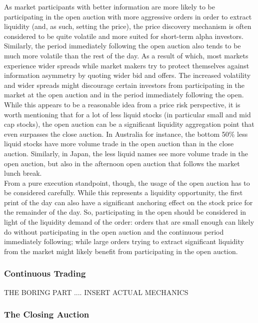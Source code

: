 As market participants with better information are more likely to be participating in the open auction with more aggressive orders in order to extract liquidity (and, as such, setting the price), the price discovery mechanism is often considered to be quite volatile and more suited for short-term alpha investors. Similarly, the period immediately following the open auction also tends to be much more volatile than the rest of the day. As a result of which, most markets experience wider spreads while market makers try to protect themselves against information asymmetry by quoting wider bid and offers. 
The increased volatility and wider spreads might discourage certain investors from participating in the market at the open auction and in the period immediately following the open. While this appears to be a reasonable idea from a price risk perspective, it is worth mentioning that for a lot of less liquid stocks (in particular small and mid cap stocks), the open auction can be a significant liquidity aggregation point that even surpasses the close auction. In Australia for instance, the bottom 50\% less liquid stocks have more volume trade in the open auction than in the close auction. Similarly, in Japan, the less liquid names see more volume trade in the open auction, but also in the afternoon open auction that follows the market lunch break.\\

From a pure execution standpoint, though, the usage of the open auction has to be considered carefully. While this represents a liquidity opportunity, the first print of the day can also have a significant anchoring effect on the stock price for the remainder of the day. So, participating in the open should be considered in light of the liquidity demand of the order: orders that are small enough can likely do without participating in the open auction and the continuous period immediately following; while large orders trying to extract significant liquidity from the market might likely benefit from participating in the open auction.


\subsubsection{Continuous Trading}

THE BORING PART .... INSERT ACTUAL MECHANICS \\


\subsubsection{The Closing Auction}

